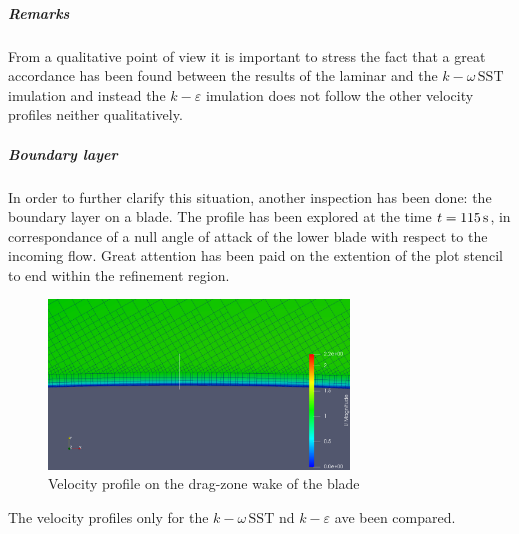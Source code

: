 \documentclass[a4paper,12pt]{article}
\newcommand{\kepsilon}[1]{$k\!-\!\varepsilon $ }
\newcommand{\komegasst}[1]{$k\!-\!\omega \, \text{SST} $ }
\begin{document}

\subparagraph{Remarks}
From a qualitative point of view it is important to stress the fact that a great accordance has been found between the results of the laminar and the \komegasst simulation and instead the \kepsilon simulation does not follow the other velocity profiles neither qualitatively.

\subparagraph{Boundary layer}
In order to further clarify this situation, another inspection has been done: the boundary layer on a blade.
The profile has been explored at the time $t=115\,\text{s}$, in correspondance of a null angle of attack of the lower blade with respect to the incoming flow.
Great attention has been paid on the extention of the plot stencil to end within the refinement region.


\begin{figure}[H]
\centering
\includegraphics[width=8cm]{images/turbulence/BL_LowerBlade_screenshot.png} 
\caption{Velocity profile on the drag-zone wake of the blade}
\centering
\end{figure}

The velocity profiles only for the \komegasst and \kepsilon have been compared.
\end{document}
